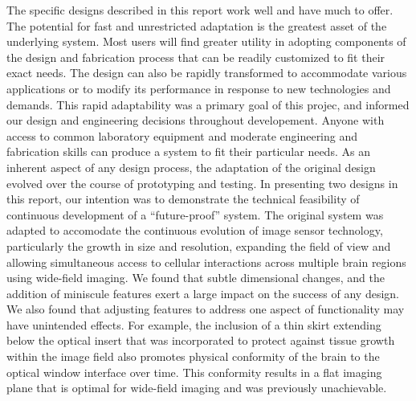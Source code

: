 The specific designs described in this report work well and have much to offer.  The potential for fast and unrestricted adaptation is the greatest asset of the underlying system. Most users will find greater utility in adopting components of the design and fabrication process that can be readily customized to fit their exact needs. The design can also be rapidly transformed to accommodate various applications or to modify its performance in response to new technologies and demands. This rapid adaptability was a primary goal of this projec, and informed our design and engineering decisions throughout developement. Anyone with access to common laboratory equipment and moderate engineering and fabrication skills can produce a system to fit their particular needs. As an inherent aspect of any design process, the adaptation of the original design evolved over the course of prototyping and testing. In presenting two designs in this report, our intention was to demonstrate the technical feasibility of continuous development of a “future-proof” system. The original system was adapted to accomodate the continuous evolution of image sensor technology, particularly the growth in size and resolution, expanding the field of view and allowing simultaneous access to cellular interactions across multiple brain regions using wide-field imaging.
We found that subtle dimensional changes, and the addition of miniscule features exert a large impact on the success of any design. We also found that adjusting features to address one aspect of functionality may have unintended effects. For example, the inclusion of a thin skirt extending below the optical insert that was incorporated to protect against tissue growth within the image field also promotes physical conformity of the brain to the optical window interface over time. This conformity results in a flat imaging plane that is optimal for wide-field imaging and was previously unachievable. 


